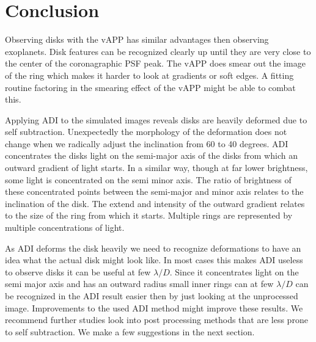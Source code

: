 
%

\section{Conclusion}

Observing disks with the \ac{vAPP} has similar advantages then observing exoplanets. Disk features can be recognized clearly up until they are very close to the center of the coronagraphic \ac{PSF} peak. The \ac{vAPP} does smear out the image of the ring which makes it harder to look at gradients or soft edges. A fitting routine factoring in the smearing effect of the \ac{vAPP} might be able to combat this.

Applying \ac{ADI} to the simulated images reveals disks are heavily deformed due to self subtraction. Unexpectedly the morphology of the deformation does not change when we radically adjust the inclination from 60 to 40 degrees. \ac{ADI} concentrates the disks light on the semi-major axis of the disks from which an outward gradient of light starts. In a similar way, though at far lower brightness, some light is concentrated on the semi minor axis. The ratio of brightness of these concentrated points between the semi-major and minor axis relates to the inclination of the disk. The extend and intensity of the outward gradient relates to the size of the ring from which it starts. Multiple rings are represented by multiple concentrations of light.

As \ac{ADI} deforms the disk heavily we need to recognize deformations to have an idea what the actual disk might look like. In most cases this makes \ac{ADI} useless to observe disks it can be useful at few $\lambda/D$. Since it concentrates light on the semi major axis and has an outward radius small inner rings can at few $\lambda/D$ can be recognized in the \ac{ADI} result easier then by just looking at the unprocessed image. Improvements to the used \ac{ADI} method might improve these results. We recommend further studies look into post processing methods that are less prone to self subtraction. We make a few suggestions in the next section.
